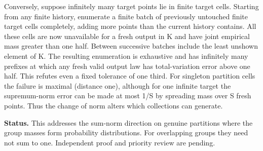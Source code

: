\documentclass[11pt]{article}
\begin{document}
Conversely, suppose infinitely many target points lie in finite target cells. Starting from any finite history, enumerate a finite batch of previously untouched finite target cells completely, adding more points than the current history contains. All these cells are now unavailable for a fresh output in K and have joint empirical mass greater than one half. Between successive batches include the least unshown element of K. The resulting enumeration is exhaustive and has infinitely many prefixes at which any fresh valid output law has total-variation error above one half. This refutes even a fixed tolerance of one third. For singleton partition cells the failure is maximal (distance one), although for one infinite target the supremum-norm error can be made at most 1/\textbar S\textbar{} by spreading mass over \textbar S\textbar{} fresh points. Thus the change of norm alters which collections can generate.

\textbf{Status.} This addresses the sum-norm direction on genuine partitions where the group masses form probability distributions. For overlapping groups they need not sum to one. Independent proof and priority review are pending.
\end{document}
